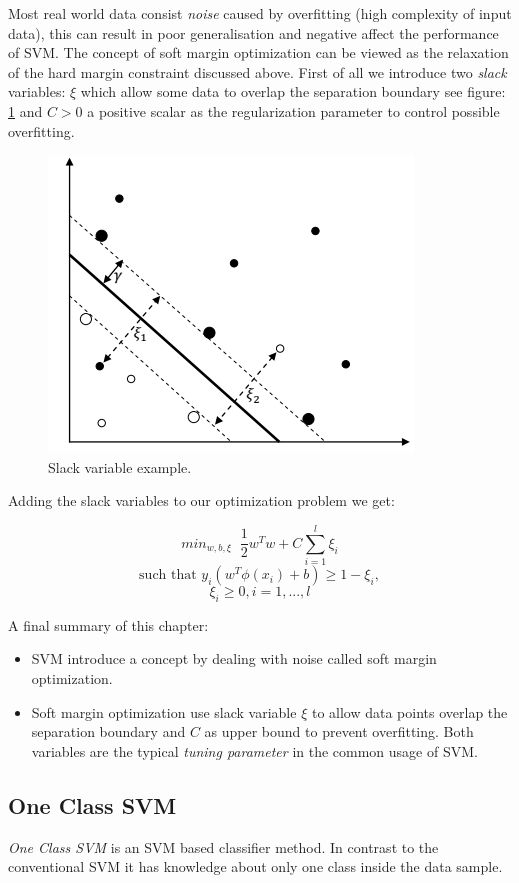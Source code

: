 Most real world data consist \textit{noise} caused by overfitting (high complexity of input data), this can result in poor generalisation and negative affect the performance of SVM. The concept of soft margin optimization can be viewed as the relaxation of the hard margin constraint discussed above. First of all we introduce two \textit{slack} variables: \(\xi \) which allow some data to overlap the separation boundary see figure: \ref{fig:slackvariable} and \(C > 0\)  a positive scalar as the regularization parameter to control possible overfitting.
\begin{figure}[h!]
    \centering
    \includegraphics[scale=0.4]{Graphics/svm-slack-variable.png}
    \caption{Slack variable example.}
    \label{fig:slackvariable}
\end{figure}
Adding the slack variables to our optimization problem we get:

\[ min_{w,b,\xi} \;\; \frac{1}{2}w^Tw+C \sum_{i=1}^{l} \xi_i\]
\[ \textrm{such that } y_i(w^T\phi(x_i) + b) \geq 1 - \xi_i, \]
\[\xi_i \geq 0, i = 1,...,l \]

A final summary of this chapter:

\begin{itemize}
    \item SVM introduce a concept by dealing with noise called soft margin optimization.
    
    \item Soft margin optimization use slack variable \(\xi \) to allow data points overlap the separation boundary and \(C\) as upper bound to prevent overfitting. Both variables are the typical \textit{tuning parameter} in the common usage of SVM.
\end{itemize}


\subsection{One Class SVM}\label{Chapter:OC-SVM}
\textit{One Class SVM} is an SVM based classifier method. In contrast to the conventional SVM it has knowledge about only one class inside the data sample. 

